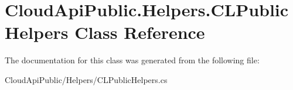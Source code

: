 \hypertarget{class_cloud_api_public_1_1_helpers_1_1_c_l_public_helpers}{\section{Cloud\-Api\-Public.\-Helpers.\-C\-L\-Public\-Helpers Class Reference}
\label{class_cloud_api_public_1_1_helpers_1_1_c_l_public_helpers}
}


The documentation for this class was generated from the following file\-:\begin{DoxyCompactItemize}
\item 
Cloud\-Api\-Public/\-Helpers/C\-L\-Public\-Helpers.\-cs\end{DoxyCompactItemize}
